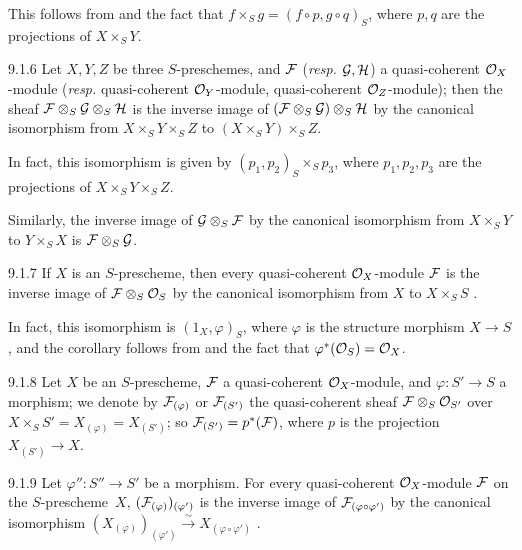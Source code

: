 \documentclass[../main.tex]{subfiles}
\begin{document}
This follows from  and the fact that $f\times_S g=(f\circ p, g\circ q)_S$, where $p,q$ are the projections of $X\times_S Y$.

\begin{env}[Corollary]{9.1.6}
    Let $X,Y,Z$ be three $S$-preschemes, and $\mathcal{F}$ (\emph{resp.} $\mathcal{G},\mathcal{H}$) a quasi-coherent $\mathcal{O}_X$-module (\emph{resp.} quasi-coherent $\mathcal{O}_Y$-module, quasi-coherent $\mathcal{O}_Z$-module); then the sheaf $\mathcal{F}\otimes_S\mathcal{G}\otimes_S\mathcal{H}$ is the inverse image of $(\mathcal{F}\otimes_S\mathcal{G})\otimes_S\mathcal{H}$ by the canonical isomorphism from $X\times_S Y\times_S Z$ to $(X\times_S Y)\times_S Z$.
\end{env}

In fact, this isomorphism is given by $(p_1,p_2)_S\times_S p_3$, where $p_1,p_2,p_3$ are the projections of $X\times_S Y\times_S Z$.

Similarly, the inverse image of $\mathcal{G}\otimes_S\mathcal{F}$ by the canonical isomorphism from $X\times_S Y$ to $Y\times_S X$ is $\mathcal{F}\otimes_S\mathcal{G}$.

\begin{env}[Corollary]{9.1.7}
    If $X$ is an $S$-prescheme, then every quasi-coherent $\mathcal{O}_X$-module $\mathcal{F}$ is the inverse image of $\mathcal{F}\otimes_S\mathcal{O}_S$ by the canonical isomorphism from $X$ to $X\times_S S$ .
\end{env}

In fact, this isomorphism is $(1_X,\varphi)_S$, where $\varphi$ is the structure morphism $X\to S$, and the corollary follows from  and the fact that $\varphi^\ast(\mathcal{O}_S)=\mathcal{O}_X$.

\begin{env}{9.1.8}
    Let $X$ be an $S$-prescheme, $\mathcal{F}$ a quasi-coherent $\mathcal{O}_X$-module, and $\varphi\colon S'\to S$ a morphism; we denote by $\mathcal{F}_{(\varphi)}$ or $\mathcal{F}_{(S')}$ the quasi-coherent sheaf $\mathcal{F}\otimes_S\mathcal{O}_{S'}$ over $X\times_S S'=X_{(\varphi)}=X_{(S')}$; so $\mathcal{F}_{(S')}=p^\ast(\mathcal{F})$, where $p$ is the projection $X_{(S')}\to X$.
\end{env}

\begin{env}[Proposition]{9.1.9}
    Let $\varphi''\colon S''\to S'$ be a morphism.
    For every quasi-coherent $\mathcal{O}_X$-module $\mathcal{F}$ on the $S$-prescheme~$X$, $(\mathcal{F}_{(\varphi)})_{(\varphi')}$ is the inverse image of $\mathcal{F}_{(\varphi\circ\varphi')}$ by the canonical isomorphism $(X_{(\varphi)})_{(\varphi')}\xrightarrow{\sim}X_{(\varphi\circ\varphi')}$ .
\end{env}
\end{document}
